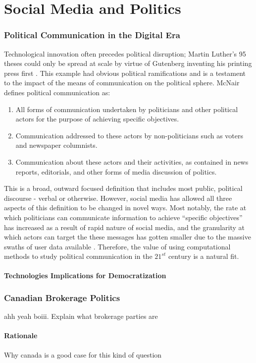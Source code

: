 \chapter{Social Media and Politics}\label{ch:SMandPolitics}

\subsection{Political Communication in the Digital Era}

Technological innovation often precedes political disruption; Martin Luther’s 95 theses could only be spread at scale by virtue of Gutenberg inventing his printing press first \cite{gardels2019renovating}. 
This example had obvious political ramifications and is a testament to the impact of the means of communication on the political sphere. McNair defines political communication as:
\begin{enumerate}
    \item All forms of communication undertaken by politicians and other political actors for the purpose of achieving specific objectives.
    \item Communication addressed to these actors by non-politicians such as voters and newspaper columnists.
    \item Communication about these actors and their activities, as contained in news reports, editorials, and other forms of media discussion of politics. \cite{mcnair2017introduction}
  \end{enumerate} 
This is a broad, outward focused definition that includes most public, political discourse - verbal or otherwise. However, social media has allowed all three aspects of this definition to be changed in novel ways. 
Most notably, the rate at which politicians can communicate information to achieve “specific objectives” has increased as a result of rapid nature of social media, and the granularity at which actors can target the these messages has gotten smaller due to the massive swaths of user data available \cite{nickerson2014political}.
Therefore, the value of using computational methods to study political communication in the  $21^{st}$ century is a natural fit.

\subsubsection{Technologies Implications for Democratization}


\subsection{Canadian Brokerage Politics}

ahh yeah boiii. Explain what brokerage parties are

\subsubsection{Rationale}

Why canada is a good case for this kind of question